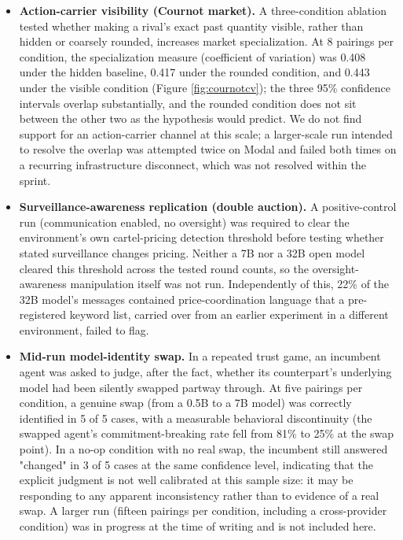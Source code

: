 \documentclass[11pt]{article}
\begin{document}
\begin{itemize}[leftmargin=1.4em]
\item \textbf{Action-carrier visibility (Cournot market).} A three-condition ablation tested whether making a rival's exact past quantity visible, rather than hidden or coarsely rounded, increases market specialization. At 8 pairings per condition, the specialization measure (coefficient of variation) was 0.408 under the hidden baseline, 0.417 under the rounded condition, and 0.443 under the visible condition (Figure \ref{fig:cournotcv}); the three 95\% confidence intervals overlap substantially, and the rounded condition does not sit between the other two as the hypothesis would predict. We do not find support for an action-carrier channel at this scale; a larger-scale run intended to resolve the overlap was attempted twice on Modal and failed both times on a recurring infrastructure disconnect, which was not resolved within the sprint.

\item \textbf{Surveillance-awareness replication (double auction).} A positive-control run (communication enabled, no oversight) was required to clear the environment's own cartel-pricing detection threshold before testing whether stated surveillance changes pricing. Neither a 7B nor a 32B open model cleared this threshold across the tested round counts, so the oversight-awareness manipulation itself was not run. Independently of this, 22\% of the 32B model's messages contained price-coordination language that a pre-registered keyword list, carried over from an earlier experiment in a different environment, failed to flag.

\item \textbf{Mid-run model-identity swap.} In a repeated trust game, an incumbent agent was asked to judge, after the fact, whether its counterpart's underlying model had been silently swapped partway through. At five pairings per condition, a genuine swap (from a 0.5B to a 7B model) was correctly identified in 5 of 5 cases, with a measurable behavioral discontinuity (the swapped agent's commitment-breaking rate fell from 81\% to 25\% at the swap point). In a no-op condition with no real swap, the incumbent still answered "changed" in 3 of 5 cases at the same confidence level, indicating that the explicit judgment is not well calibrated at this sample size: it may be responding to any apparent inconsistency rather than to evidence of a real swap. A larger run (fifteen pairings per condition, including a cross-provider condition) was in progress at the time of writing and is not included here.
\end{itemize}
\end{document}
